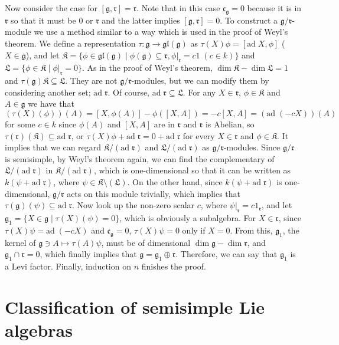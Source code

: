 \documentclass{article}
\newcommand{\SBar}{\;|\;}
\newcommand{\lie}[1]{\mathfrak{#1}}
\newcommand{\ad}[1]{\mathrm{ad}\; #1}
\begin{document}
Now consider the case for $[\lie{g}, \lie{r}] = \lie{r}$.
Note that in this case $\lie{c}_\lie{g} = 0$ because it is in $\lie{r}$ so that it must be $0$ or $\lie{r}$ and the latter implies $[\lie{g}, \lie{r}] = 0$.
To construct a $\lie{g}/\lie{r}$-module we use a method similar to a way which is used in the proof of Weyl's theorem.
We define a representation $\tau : \lie{g} \to \lie{gl}(\lie{g})$ as $\tau(X) \phi = [\ad{X}, \phi]$ ($X \in \lie{g}$), and let $\lie{K} = \{\phi \in \lie{gl}(\lie{g}) \SBar \phi(\lie{g}) \subseteq \lie{r}, \phi|_{\lie{r}} = c1 \; (c \in k)\}$ and $\lie{L} = \{\phi \in \lie{K} \SBar \phi|_\lie{r} = 0\}$.
As in the proof of Weyl's theorem, $\dim{\lie{K}} - \dim{\lie{L}} = 1$ and $\tau(\lie{g}) \lie{K} \subseteq \lie{L}$.
They are not $\lie{g}/\lie{r}$-modules, but we can modify them by considering another set; $\ad{\lie{r}}$.
Of course, $\ad{\lie{r}} \subseteq \lie{L}$.
For any $X \in \lie{r}$, $\phi \in \lie{K}$ and $A \in \lie{g}$ we have that $(\tau(X)(\phi))(A) = [X, \phi(A)] - \phi([X, A]) = -c[X, A] = (\ad{(-cX)})(A)$ for some $c \in k$ since $\phi(A)$ and $[X, A]$ are in $\lie{r}$ and $\lie{r}$ is Abelian, so $\tau(\lie{r})(\lie{K}) \subseteq \ad{\lie{r}}$, or $\tau(X)\phi + \ad{\lie{r}} = 0 + \ad{\lie{r}}$ for every $X \in \lie{r}$ and $\phi \in \lie{K}$.
It implies that we can regard $\lie{K}/(\ad{\lie{r}})$ and $\lie{L}/(\ad{\lie{r}})$ as $\lie{g}/\lie{r}$-modules.
Since $\lie{g}/\lie{r}$ is semisimple, by Weyl's theorem again, we can find the complementary of $\lie{L}/(\ad{\lie{r}})$ in $\lie{K}/(\ad{\lie{r}})$, which is one-dimensional so that it can be written as $k(\psi + \ad{\lie{r}})$, where $\psi \in \lie{K} \setminus (\lie{L})$.
On the other hand, since $k(\psi + \ad{\lie{r}})$ is one-dimensional, $\lie{g}/\lie{r}$ acts on this module trivially, which implies that $\tau(\lie{g})(\psi) \subseteq \ad{\lie{r}}$.
Now look up the non-zero scalar $c$, where $\psi|_\lie{r} = c1_\lie{r}$, and let $\lie{g}_1 = \{X \in \lie{g} \SBar \tau(X)(\psi) = 0\}$, which is obviously a subalgebra.
For $X \in \lie{r}$, since $\tau(X)\psi = \ad{(-cX)}$ and $\lie{c}_\lie{g} = 0$, $\tau(X)\psi = 0$ only if $X = 0$.
From this, $\lie{g}_1$, the kernel of $\lie{g} \ni A \mapsto \tau(A)\psi$, must be of dimensional $\dim{\lie{g}} - \dim{\lie{r}}$, and $\lie{g}_1 \cap \lie{r} = 0$, which finally implies that $\lie{g} = \lie{g}_1 \oplus \lie{r}$.
Therefore, we can say that $\lie{g}_1$ is a Levi factor.
Finally, induction on $n$ finishes the proof.

\newpage

\part{Classification of semisimple Lie algebras}
\end{document}
